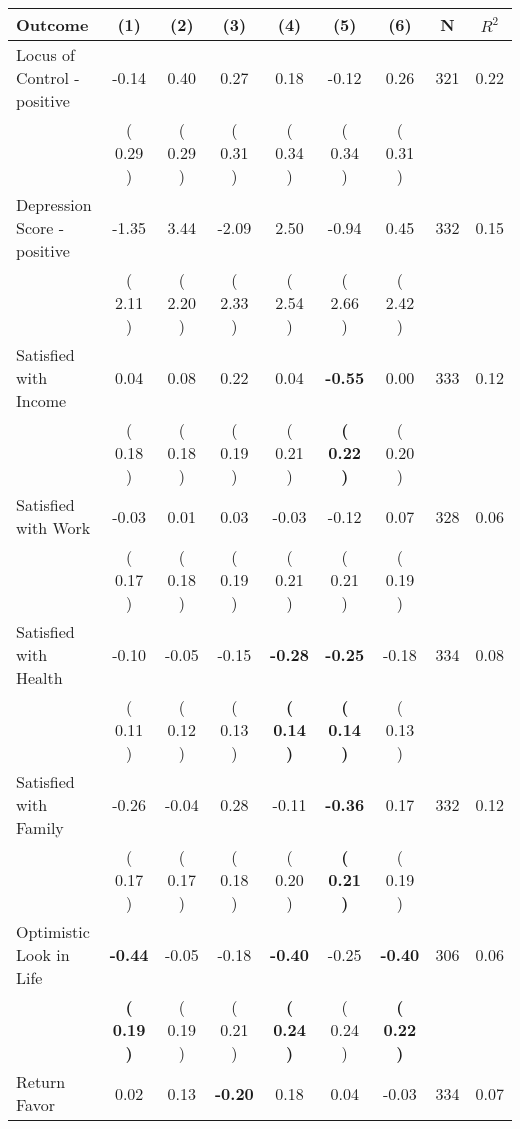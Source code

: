 \begin{tabular}{lcccccccc}
\toprule
 \textbf{Outcome} & \textbf{(1)} & \textbf{(2)} & \textbf{(3)} & \textbf{(4)} & \textbf{(5)} & \textbf{(6)} & \textbf{N} & \textbf{$ R^2$} \\
\midrule
Locus of Control - positive &     -0.14 &      0.40 &      0.27 &      0.18 &     -0.12 &      0.26 & 321 &       0.22 \\ 
 & (     0.29 ) & (     0.29 ) & (     0.31 ) & (     0.34 ) & (     0.34 ) & (     0.31 ) & \\
Depression Score - positive &     -1.35 &      3.44 &     -2.09 &      2.50 &     -0.94 &      0.45 & 332 &       0.15 \\ 
 & (     2.11 ) & (     2.20 ) & (     2.33 ) & (     2.54 ) & (     2.66 ) & (     2.42 ) & \\
Satisfied with Income &      0.04 &      0.08 &      0.22 &      0.04 & \textbf{    -0.55} &      0.00 & 333 &       0.12 \\ 
 & (     0.18 ) & (     0.18 ) & (     0.19 ) & (     0.21 ) & \textbf{(     0.22 )} & (     0.20 ) & \\
Satisfied with Work &     -0.03 &      0.01 &      0.03 &     -0.03 &     -0.12 &      0.07 & 328 &       0.06 \\ 
 & (     0.17 ) & (     0.18 ) & (     0.19 ) & (     0.21 ) & (     0.21 ) & (     0.19 ) & \\
Satisfied with Health &     -0.10 &     -0.05 &     -0.15 & \textbf{    -0.28} & \textbf{    -0.25} &     -0.18 & 334 &       0.08 \\ 
 & (     0.11 ) & (     0.12 ) & (     0.13 ) & \textbf{(     0.14 )} & \textbf{(     0.14 )} & (     0.13 ) & \\
Satisfied with Family &     -0.26 &     -0.04 &      0.28 &     -0.11 & \textbf{    -0.36} &      0.17 & 332 &       0.12 \\ 
 & (     0.17 ) & (     0.17 ) & (     0.18 ) & (     0.20 ) & \textbf{(     0.21 )} & (     0.19 ) & \\
Optimistic Look in Life & \textbf{    -0.44} &     -0.05 &     -0.18 & \textbf{    -0.40} &     -0.25 & \textbf{    -0.40} & 306 &       0.06 \\ 
 & \textbf{(     0.19 )} & (     0.19 ) & (     0.21 ) & \textbf{(     0.24 )} & (     0.24 ) & \textbf{(     0.22 )} & \\
Return Favor &      0.02 &      0.13 & \textbf{    -0.20} &      0.18 &      0.04 &     -0.03 & 334 &       0.07 \\ 

\end{tabular}
